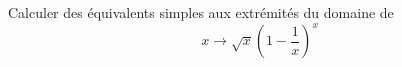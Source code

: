 Calculer des \'{e}quivalents simples aux extr\'{e}mit\'{e}s du domaine de
\[x \rightarrow \sqrt x \left( 1- \frac{1}{x}\right)^x\]
\bigskip \bigskip \bigskip
